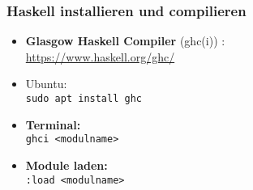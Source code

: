 \documentclass[aspectratio=1610,onlymath, ngerman, handout]{beamer}
\renewcommand{\emph}[1]{\textbf{#1}}
\begin{document}
        
%       
%        
%

    \begin{frame}\frametitle{Haskell installieren und compilieren}
        \begin{itemize}
            \item \emph{Glasgow Haskell Compiler} (ghc(i)) : \\ \url{https://www.haskell.org/ghc/}
            \item Ubuntu: \\
            \texttt{sudo apt install ghc}
            
            \medskip
            
            \item \emph{Terminal:} \\
            \texttt{ghci <modulname>}
            \item \emph{Module laden: } \\
            \texttt{:load <modulname>}
        \end{itemize}
    \end{frame}
\end{document}
